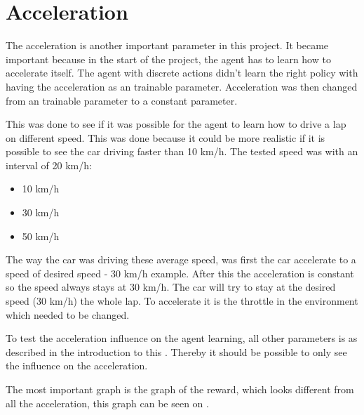 \section{Acceleration}\label{sectionAcceleration}
The acceleration is another important parameter in this project. It became important because in the start of the project, the agent has to learn how to accelerate itself. The agent with discrete actions didn't learn the right policy with having the acceleration as an trainable parameter. Acceleration was then changed from an trainable parameter to a constant parameter.

This was done to see if it was possible for the agent to learn how to drive a lap on different speed. This was done because it could be more realistic if it is possible to see the car driving faster than 10 km/h. The tested speed was with an interval of 20 km/h:
\begin{itemize}
	\item 10 km/h
	\item 30 km/h
	\item 50 km/h
\end{itemize} 

The way the car was driving these average speed, was first the car accelerate to a speed of desired speed - 30 km/h example. After this the acceleration is constant so the speed always stays at 30 km/h. The car will try to stay at the desired speed (30 km/h) the whole lap. To accelerate it is the throttle in the environment which needed to be changed.

To test the acceleration influence on the agent learning, all other parameters is as described in the introduction to this . Thereby it should be possible to only see the influence on the acceleration.

The most important graph is the graph of the reward, which looks different from all the acceleration, this graph can be seen on .


